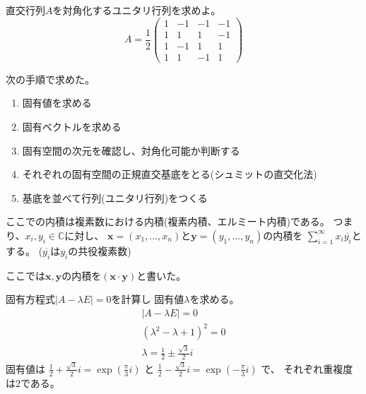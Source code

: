 \documentclass[10pt,b5paper]{ltjsarticle}
\begin{document}
直交行列$A$を対角化するユニタリ行列を求めよ。
\begin{equation}
 A=\frac{1}{2}
    \begin{pmatrix}
     1 & -1 & -1 & -1\\
     1 & 1 & 1 & -1\\
     1 & -1 & 1 & 1\\
     1 & 1 & -1 & 1
    \end{pmatrix}
\end{equation}

\dotfill

次の手順で求めた。
\begin{enumerate}
 \item 固有値を求める
 \item 固有ベクトルを求める
 \item 固有空間の次元を確認し、対角化可能か判断する
 \item それぞれの固有空間の正規直交基底をとる(シュミットの直交化法)
 \item 基底を並べて行列(ユニタリ行列)をつくる
\end{enumerate}

ここでの内積は複素数における内積(複素内積、エルミート内積)である。
つまり、$x_i,y_i\in\mathbb{C}$に対し、
$\bm{x}=(x_1,\dots,x_n)$と$\bm{y}=(y_1,\dots,y_n)$の内積を
$\sum_{i=1}^{\infty}x_i\overline{y_i}$とする。
($\overline{y_i}$は$y_i$の共役複素数)

ここでは$\bm{x}, \bm{y}$の内積を$(\bm{x}\cdot\bm{y})$と書いた。



\dotfill

固有方程式$\lvert A-\lambda E \rvert =0$を計算し
固有値$\lambda$を求める。
\begin{align}
 \lvert A-\lambda E \rvert =0\\
 (\lambda^2-\lambda+1)^2 =0\\
 \lambda=\frac{1}{2}\pm \frac{\sqrt{3}}{2}i
\end{align}
固有値は
$\frac{1}{2}+ \frac{\sqrt{3}}{2}i=\exp{(\frac{\pi}{3}i)}$
と
$\frac{1}{2}- \frac{\sqrt{3}}{2}i=\exp{(-\frac{\pi}{3}i)}$
で、
それぞれ重複度は2である。
\end{document}
